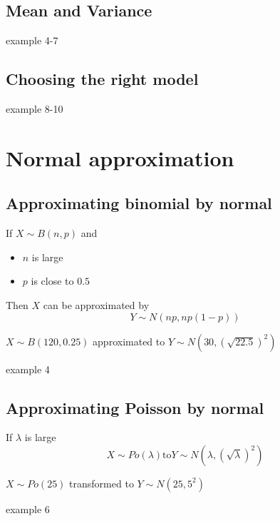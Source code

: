 \documentclass[a4paper]{article}
\begin{document}
\subsection{Mean and Variance}

\begin{eg}
    example 4-7

\end{eg}

\subsection{Choosing the right model}

\begin{eg}
    example 8-10
\end{eg}

\section{Normal approximation}
\subsection{Approximating binomial by normal}
If $X\sim B(n,p)$ and
\begin{itemize}
    \item $n$ is large
    \item $p$ is close to $0.5$
\end{itemize}
Then $X$ can be approximated by
\[
    Y\sim N(np,np(1-p))
\]

\begin{eg}
    $X\sim B(120,0.25)$ approximated to $Y\sim N(30,(\sqrt{22.5})^2)$
\end{eg}

\begin{eg}
 example 4
\end{eg}

\subsection{Approximating Poisson by normal}
If $\lambda$ is large
\[
    X\sim Po(\lambda) \text{to} Y\sim N(\lambda,(\sqrt{\lambda})^2)
\]

\begin{eg}
    $X\sim Po(25)$ transformed to $Y\sim N(25,5^2)$
\end{eg}

\begin{eg}
 example 6
\end{eg}
\end{document}
